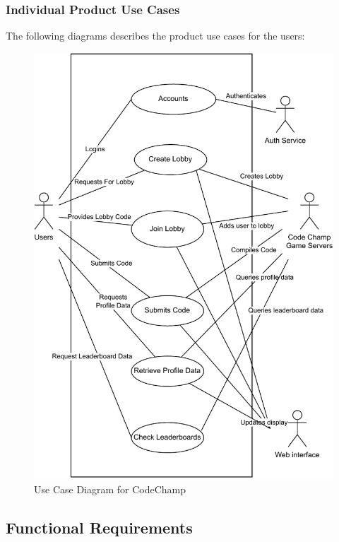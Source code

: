 \documentclass[12pt, titlepage]{article}
\begin{document}
\subsubsection{Individual Product Use Cases}
The following diagrams describes the product use cases for the users:

\begin{figure}[H]
    \includegraphics{usecasediagram.pdf}
    \caption{Use Case Diagram for CodeChamp}
    \label{fig:context-diagram}
\end{figure}


\subsection{Functional Requirements}
\end{document}
